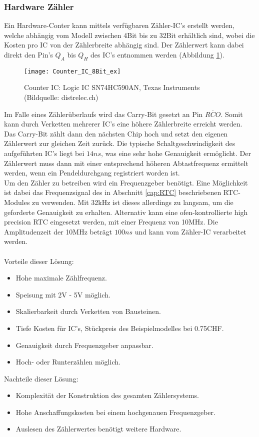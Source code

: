 	\subsubsection{Hardware Zähler}
	\label{cap:hw-counter}
		Ein Hardware-Conter kann mittels verfügbaren Zähler-IC's erstellt werden, welche abhängig vom Modell zwischen 4Bit bis zu 32Bit erhältlich sind, wobei die Kosten pro IC von der Zählerbreite abhängig sind. Der Zählerwert kann dabei direkt den Pin's $Q_A$ bis $Q_H$ des IC's entnommen werden (Abbildung \ref{fig:SN74HC590AN}).
		\begin{figure}[H]
        	\centering
        	\texttt{[image: Counter\_IC\_8Bit\_ex]}
        	\caption{Counter IC: Logic IC SN74HC590AN, Texas Instruments (Bildquelle: distrelec.ch)}
        	\label{fig:SN74HC590AN}
    	\end{figure}
\noindent Im Falle eines Zählerüberlaufs wird das Carry-Bit gesetzt an Pin $\overline{RCO}$. Somit kann durch Verketten mehrerer IC's eine höhere Zählerbreite erreicht werden. Das Carry-Bit zählt dann den nächsten Chip hoch und setzt den eigenen Zählerwert zur gleichen Zeit zurück. Die typische Schaltgeschwindigkeit des aufgeführten IC's liegt bei $14ns$, was eine sehr hohe Genauigkeit ermöglicht. Der Zählerwert muss dann mit einer entsprechend höheren Abtastfrequenz ermittelt werden, wenn ein Pendeldurchgang registriert worden ist.\\
Um den Zähler zu betreiben wird ein Frequenzgeber benötigt. Eine Möglichkeit ist dabei das Frequenzsignal des in Abschnitt \ref{cap:RTC} beschriebenen RTC-Modules zu verwenden. Mit 32kHz ist dieses allerdings zu langsam, um die geforderte Genauigkeit zu erhalten. Alternativ kann eine ofen-kontrollierte high precision RTC eingesetzt werden, mit einer Frequenz von 10MHz. Die Amplitudenzeit der 10MHz beträgt $100ns$ und kann vom Zähler-IC verarbeitet werden.\\
\\
Vorteile dieser Lösung:
    \begin{itemize}
    	\item Hohe maximale Zählfrequenz.
    	\item Speisung mit 2V - 5V möglich.
    	\item Skalierbarkeit durch Verketten von Bausteinen.
    	\item Tiefe Kosten für IC's, Stückpreis des Beispielmodelles bei 0.75CHF.
    	\item Genauigkeit durch Frequenzgeber anpassbar.
    	\item Hoch- oder Runterzählen möglich.
    \end{itemize}
    Nachteile dieser Lösung:
    \begin{itemize}
    	\item Komplexität der Konstruktion des gesamten Zählersystems.
    	\item Hohe Anschaffungskosten bei einem hochgenauen Frequenzgeber.
    	\item Auslesen des Zählerwertes benötigt weitere Hardware.
    \end{itemize}
